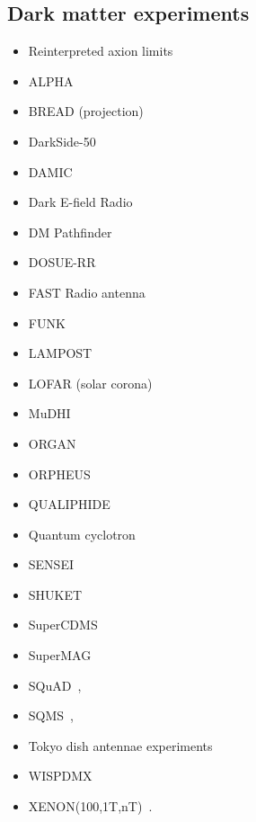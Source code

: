 \documentclass[8pt,twocolumn]{extarticle}
\begin{document}
\begin{mdframed}
\subsection*{Dark matter experiments}\vspace{-0.5em}
\begin{itemize}\setlength\itemsep{-0.5em}
\item Reinterpreted axion limits~\cite{Caputo:2021eaa}
\item ALPHA~\cite{Millar:2022peq}
\item BREAD (projection)~\cite{Liu:2021pei}
  \item DarkSide-50~\cite{DarkSide:2022knj}
\item DAMIC~\cite{Aguilar-Arevalo:2019wdi}
\item Dark E-field Radio~\cite{Godfrey:2021tvs}
\item DM Pathfinder~\cite{Phipps:2019cqy}
\item DOSUE-RR~\cite{DOSUE-RR:2022ise}
 \item FAST Radio antenna~\cite{An:2022hhb}
\item FUNK~\cite{Andrianavalomahefa:2020ucg}
\item LAMPOST~\cite{Chiles:2021gxk}
\item LOFAR (solar corona)~\cite{An:2023wij}
\item MuDHI~\cite{Manenti:2021whp}
\item ORGAN~\cite{McAllister:2022ibe}
\item ORPHEUS~\cite{Cervantes:2022yzp}
\item QUALIPHIDE~\cite{Ramanathan:2022egk}
\item Quantum cyclotron~\cite{Fan:2022uwu}
\item SENSEI~\cite{Barak:2020fql}
\item SHUKET~\cite{Brun:2019kak}
\item SuperCDMS~\cite{Aralis:2019nfa}
\item SuperMAG~\cite{Fedderke:2021rrm,Fedderke:2021aqo}
\item SQuAD~\cite{Dixit:2020ymh},
\item SQMS~\cite{Cervantes:2022gtv},
\item Tokyo dish antennae experiments~\cite{Suzuki:2015sza,Knirck:2018ojz,Tomita:2020usq}
\item  WISPDMX~\cite{Nguyen:2019xuh}
\item  XENON(100,1T,nT)~\cite{Bloch:2016sjj,Aprile:2019xxb,Aprile:2020tmw, Bloch:2020uzh,XENON:2021myl,An:2020bxd}. 
\end{itemize}
\end{mdframed}


\onecolumn{


}
\end{document}
